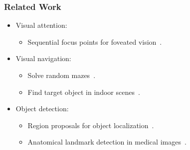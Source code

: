 \begin{frame}
    \frametitle{Related Work}

    \begin{itemize}
        \item Visual attention:
        \begin{itemize}
            \item Sequential focus points for foveated vision~\cite{mnih_recurrent_2014}.
        \end{itemize}
        \item Visual navigation:
        \begin{itemize}
            \item Solve random mazes~\cite{mirowski_learning_2017}.
            \item Find target object in indoor scenes~\cite{zhu_target-driven_2017}.
        \end{itemize}
        \item Object detection:
        \begin{itemize}
            \item Region proposals for object localization~\cite{caicedo_active_2015}.
            \item Anatomical landmark detection in medical images~\cite{ghesu_multi-scale_2019}.
        \end{itemize}
    \end{itemize}
\end{frame}